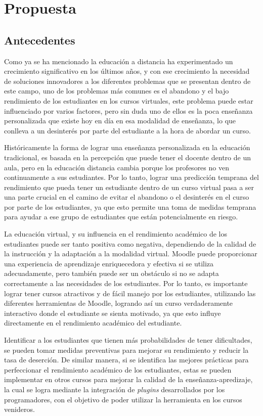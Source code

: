 \chapter{Propuesta}\label{chapter:proposal}

\section{Antecedentes}

Como ya se ha mencionado la educación a distancia ha experimentado un crecimiento significativo en los últimos años, y con ese crecimiento la necesidad de soluciones innovadores a los diferentes problemas que se presentan dentro de este campo, uno de los problemas más comunes es el abandono y el bajo rendimiento de los estudiantes en los cursos virtuales, este problema puede estar influenciado por varios factores, pero sin duda uno de ellos es la poca enseñanza personalizada que existe hoy en día en esa modalidad de enseñanza, lo que conlleva a un desinterés por parte del estudiante a la hora de abordar un curso.  


Históricamente la forma de lograr una enseñanza personalizada en la educación tradicional, es basada en la percepción que puede tener el docente dentro de un aula, pero en la educación distancia cambia porque los profesores no ven continuamente a sus estudiantes. Por lo tanto, lograr una predicción temprana del rendimiento que pueda tener un estudiante dentro de un curso virtual pasa a ser una parte crucial en el camino de evitar el abandono o el desinterés en el curso por parte de los estudiantes, ya que esto permite una toma de medidas temprana para ayudar a ese grupo de estudiantes que están potencialmente en riesgo.  

 
La educación virtual, y su influencia en el rendimiento académico de los estudiantes puede ser tanto positiva como negativa, dependiendo de la calidad de la instrucción y la adaptación a la modalidad virtual. Moodle puede proporcionar una experiencia de aprendizaje enriquecedora y efectiva si se utiliza adecuadamente, pero también puede ser un obstáculo si no se adapta correctamente a las necesidades de los estudiantes. Por lo tanto, es importante lograr tener cursos atractivos y de fácil manejo por los estudiantes, utilizando las diferentes herramientas de Moodle, logrando así un curso verdaderamente interactivo donde el estudiante se sienta motivado, ya que esto influye directamente en el rendimiento académico del estudiante.  


Identificar a los estudiantes que tienen más probabilidades de tener dificultades, se pueden tomar medidas preventivas para mejorar su rendimiento y reducir la tasa de deserción. De similar manera, si se identifica las mejores prácticas para perfeccionar el rendimiento académico de los estudiantes, estas se pueden implementar en otros cursos para mejorar la calidad de la enseñanza-apredizaje, la cual se logra mediante la integración de \textit{plugins} desarrollados por los programadores, con el objetivo de poder utilizar la herramienta en los cursos venideros.  

